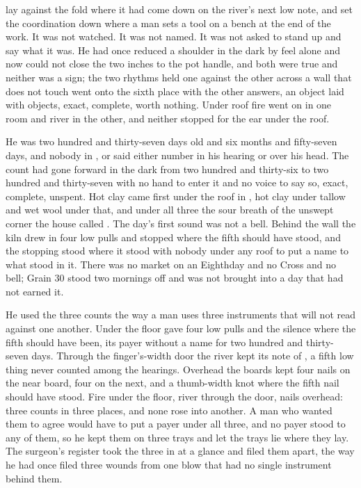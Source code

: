 
 lay against the fold where it had come down on the river's next low note, and  set the coordination down where a man sets a tool on a bench at the end of the work. It was not watched. It was not named. It was not asked to stand up and say what it was. He had once reduced a shoulder in the dark by feel alone and now could not close the two inches to the pot handle, and both were true and neither was a sign; the two rhythms held one against the other across a wall that does not touch went onto the sixth place with the other answers, an object laid with objects, exact, complete, worth nothing. Under  roof fire went on in one room and river in the other, and neither stopped for the ear under the roof.

He was two hundred and thirty-seven days old and six months and fifty-seven days, and nobody in ,  or  said either number in his hearing or over his head. The count had gone forward in the dark from two hundred and thirty-six to two hundred and thirty-seven with no hand to enter it and no voice to say so, exact, complete, unspent. Hot clay came first under the roof in , hot clay under tallow and wet wool under that, and under all three the sour  breath of the unswept corner the house called . The day's first sound was not a bell. Behind the wall the kiln drew in four low pulls and stopped where the fifth should have stood, and the stopping stood where it stood with nobody under any roof to put a name to what stood in it. There was no market on an Eighthday and no Cross and no bell; Grain 30 stood two mornings off and was not brought into a day that had not earned it.

He used the three counts the way a man uses three instruments that will not read against one another. Under the floor  gave four low pulls and the silence where the fifth should have been, its payer without a name for two hundred and thirty-seven days. Through the finger's-width door the river kept its note of , a fifth low thing never counted among the hearings. Overhead the boards kept four nails on the near board, four on the next, and a thumb-width knot where the fifth nail should have stood. Fire under the floor, river through the door, nails overhead: three counts in three places, and none rose into another. A man who wanted them to agree would have to put a payer under all three, and no payer stood to any of them, so he kept them on three trays and let the trays lie where they lay. The surgeon's register took the three in at a glance and filed them apart, the way he had once filed three wounds from one blow that had no single instrument behind them.

